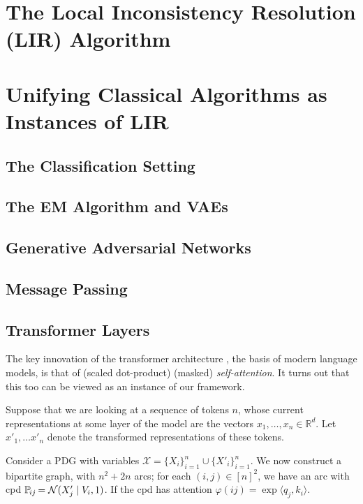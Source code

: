 \documentclass[twoside]{article}
\let\cite\citep
\begin{document}
\section{The Local Inconsistency Resolution (LIR) Algorithm}
\section{Unifying Classical Algorithms as Instances of LIR}
\subsection{The Classification Setting}
\subsection{The EM Algorithm and VAEs}
\subsection{Generative Adversarial Networks}
\subsection{Message Passing}
\subsection{Transformer Layers}


The key innovation of the transformer architecture \cite{vaswani2017attention}, the basis of modern language models, 
is that of (scaled dot-product) (masked) \emph{self-attention}.
It turns out that this too can be viewed as an instance of our framework.

Suppose that we are looking at a sequence of tokens $n$, whose current representations at some layer of the model are the vectors $x_1, \ldots, x_n \in \mathbb R^d$. 
Let $x'_1, \ldots x'_n$ denote the transformed representations of these tokens. 

Consider a PDG with variables $\mathcal X = \{ X_i \}_{i=1}^n \cup \{ X'_i\}_{i=1}^n$. 
We now construct a bipartite graph, with $n^2 + 2n$ arcs; for each $(i,j) \in [n]^2$, 
we have an arc 
with cpd $\p_{ij} = \mathcal N(X'_j \mid V_i, 1)$.
If the cpd has attention $\varphi(ij) = \exp \langle q_j, k_i\rangle$.
\end{document}
